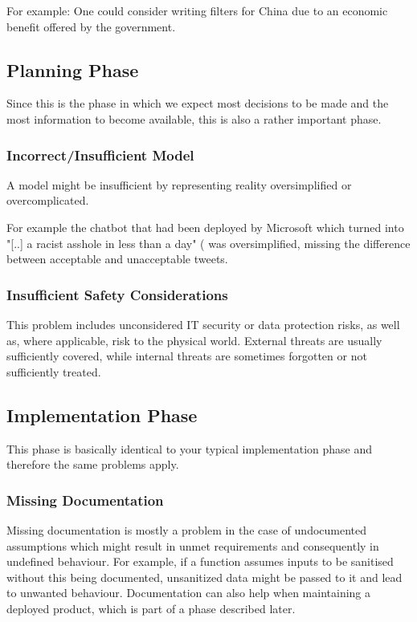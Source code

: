 For example:
One could consider writing filters for China due to an economic benefit offered by the government.

\subsection{Planning Phase}
Since this is the phase in which we expect most decisions to be made and 
the most information to become available, this is also a rather important phase.

\subsubsection{Incorrect/Insufficient Model}

A model might be insufficient by representing reality oversimplified or overcomplicated.

For example the chatbot that had been deployed by Microsoft
 which turned into "[..] a racist asshole in less than a day" (\cite{James2018} was oversimplified, missing the difference between acceptable and unacceptable tweets.
 
\subsubsection{Insufficient Safety Considerations}
This problem includes unconsidered IT security or data protection risks, as well as, where applicable, risk to the physical world.
External threats are usually sufficiently covered, while internal threats are sometimes forgotten or not sufficiently treated. 

\subsection{Implementation Phase}
This phase is basically identical to your typical implementation 
phase and therefore the same problems apply.

\subsubsection{Missing Documentation}

Missing documentation is mostly a problem in the case of undocumented assumptions which might result in unmet requirements and consequently in undefined behaviour. For example, if a function assumes inputs to be sanitised without this being documented, unsanitized data might be passed to it and lead to unwanted behaviour. Documentation can also help when maintaining a deployed product, which is part of a phase described later.

